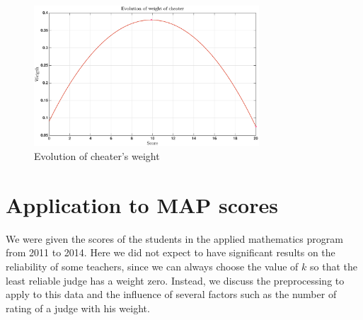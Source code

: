 \documentclass[12pt,a4paper]{article}
\begin{document}
\begin{figure}[h!]
\centering
\includegraphics[width = 0.75\textwidth]{cheaters/evolution_cheater_weight.eps}
\caption{Evolution of cheater's weight}
\label{fig:howto_weight}
\end{figure}




\section*{Application to MAP scores}
We were given the scores of the students in the applied mathematics program from 2011 to 2014. Here we did not expect to have significant results on the reliability of some teachers, since we can always choose the value of $k$ so that the least reliable judge has a weight zero. Instead, we discuss the preprocessing to apply to this data and the influence of several factors such as the number of rating of a judge with his weight.


\FloatBarrier
\end{document}
